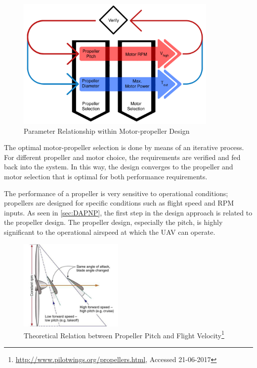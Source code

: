 \begin{figure}[H]
    \centering
    \includegraphics[width=0.87\textwidth]{PowerPropulsion/Figures/propnpowerrocessor.jpg}
    \caption{Parameter Relationship within Motor-propeller Design}
    \label{fig:parap}
\end{figure}

The optimal motor-propeller selection is done by means of an iterative process. For different propeller and motor choice, the requirements are verified and fed back into the system. In this way, the design converges to the propeller and motor selection that is optimal for both performance requirements.  

The performance of a propeller is very sensitive to operational conditions; propellers are designed for specific conditions such as flight speed and RPM inputs. As seen in \autoref{sec:DAPNP}, the first step in the design approach is related to the propeller design. The propeller design, especially the pitch, is highly significant to the operational airspeed at which the UAV can operate.



\begin{figure}[H]
    \centering
    \includegraphics[width=0.45\textwidth]{PowerPropulsion/Figures/proppitch.jpg}
    \caption{Theoretical Relation between Propeller Pitch and Flight Velocity\footnote{\url{http://www.pilotwings.org/propellers.html}, Accessed 21-06-2017}}
    \label{fig:pitch}
\end{figure}


